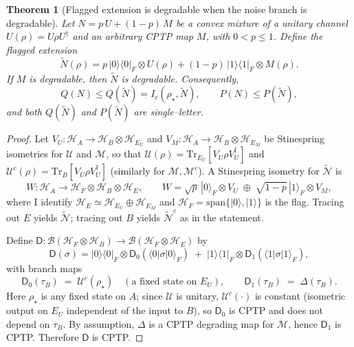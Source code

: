 \documentclass[11pt]{article}
\theoremstyle{plain}
\newtheorem{theorem}{Theorem}[section]
\theoremstyle{definition}
\numberwithin{equation}{section}
\begin{document}
\begin{theorem}[Flagged extension is degradable when the noise branch is degradable]\label{th22}
Let $N = p\,U + (1-p)\,M$ be a convex mixture of a unitary channel $U(\rho)=U\rho U^\dagger$ and an arbitrary CPTP map $M$, with $0<p\le 1$. Define the flagged extension
\[
\widetilde N(\rho)= p\,|0\rangle\!\langle 0|_F\otimes U(\rho) + (1-p)\,|1\rangle\!\langle 1|_F\otimes M(\rho).
\]
If $M$ is degradable, then $\widetilde N$ is degradable. Consequently,
\[
Q(N)\le Q(\widetilde N)= I_c(\rho_\star,\widetilde N),\qquad 
P(N)\le P(\widetilde N),
\]
and both $Q(\widetilde N)$ and $P(\widetilde N)$ are single–letter.
\end{theorem}


\begin{proof}
Let $V_U:\mathcal H_A\!\to\!\mathcal H_B\!\otimes\!\mathcal H_{E_U}$ and $V_M:\mathcal H_A\!\to\!\mathcal H_B\!\otimes\!\mathcal H_{E_M}$ be Stinespring isometries for $\mathcal U$ and $\mathcal M$, so that
$\mathcal U(\rho)=\mathrm{Tr}_{E_U}\!\left[V_U\rho V_U^\dagger\right]$ and
$\mathcal U^c(\rho)=\mathrm{Tr}_{B}\!\left[V_U\rho V_U^\dagger\right]$ (similarly for $\mathcal M,\mathcal M^c$).
A Stinespring isometry for $\widetilde{\mathcal N}$ is
\[
W:\mathcal H_A \to \mathcal H_F\!\otimes\!\mathcal H_B\!\otimes\!\mathcal H_E,\qquad
W=\sqrt{p}\,|0\rangle_F\!\otimes V_U \;\oplus\; \sqrt{1-p}\,|1\rangle_F\!\otimes V_M,
\]
where I identify $\mathcal H_E\simeq \mathcal H_{E_U}\oplus \mathcal H_{E_M}$ and $\mathcal H_F=\mathrm{span}\{|0\rangle,|1\rangle\}$ is the flag.
Tracing out $E$ yields $\widetilde{\mathcal N}$; tracing out $B$ yields $\widetilde{\mathcal N}^c$ as in the statement.

Define $\mathsf D:\mathcal B(\mathcal H_F\!\otimes\!\mathcal H_B)\!\to\!\mathcal B(\mathcal H_F\!\otimes\!\mathcal H_E)$ by
\[
\mathsf D(\sigma)= |0\rangle\!\langle 0|_F\!\otimes\!\mathsf D_0(\langle 0|\sigma|0\rangle_F)\;+\;|1\rangle\!\langle 1|_F\!\otimes\!\mathsf D_1(\langle 1|\sigma|1\rangle_F),
\]
with branch maps
\[
\mathsf D_0(\tau_B) \;=\; \mathcal U^c(\rho_\star)\quad(\text{a fixed state on }E_U),\qquad
\mathsf D_1(\tau_B) \;=\; \Delta(\tau_B).
\]
Here $\rho_\star$ is any fixed state on $A$; since $\mathcal U$ is unitary, $\mathcal U^c(\cdot)$ is constant (isometric output on $E_U$ independent of the input to $B$), so $\mathsf D_0$ is CPTP and does not depend on $\tau_B$. By assumption, $\Delta$ is a CPTP degrading map for $\mathcal M$, hence $\mathsf D_1$ is CPTP. Therefore $\mathsf D$ is CPTP.


\end{proof}
\end{document}
